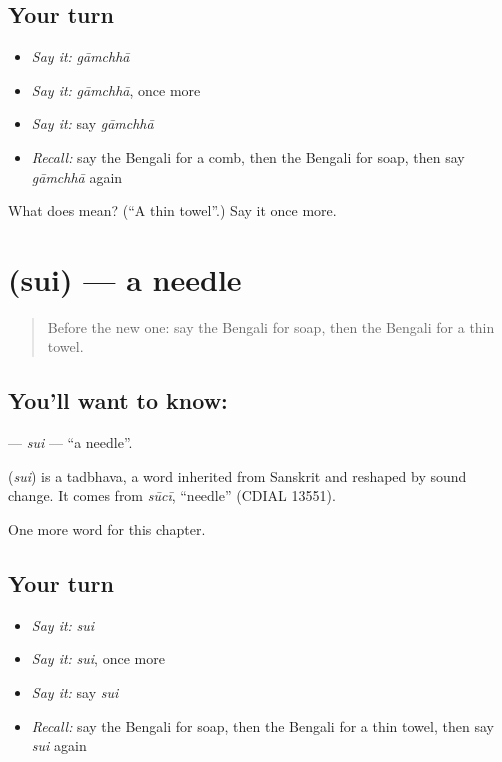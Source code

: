 \subsection*{Your turn}
\begin{itemize}
\raggedright
  \item \emph{Say it:} \emph{gāmchhā}
  \item \emph{Say it:} \emph{gāmchhā}, once more
  \item \emph{Say it:} say \emph{gāmchhā}
  \item \emph{Recall:} say the Bengali for a comb, then the Bengali for soap, then say \emph{gāmchhā} again
\end{itemize}

\begin{tcolorbox}[breakable,colback=teal!4,colframe=teal!35!black,title={Before you move on}]
What does  mean? (\textquotedblleft{}A thin towel\textquotedblright{}.) Say it once more.
\end{tcolorbox}
\section[\texorpdfstring{\bn{সুই} (sui)}{সুই (sui)}]{ (sui) — a needle}

\label{lesson:BN-C109-sui}



\begin{quote}
Before the new one: say the Bengali for soap, then the Bengali for a thin towel.
\end{quote}

\subsection*{You'll want to know: }
\textbf{} — \emph{sui} — \textquotedblleft{}a needle\textquotedblright{}.

\begin{cousinweb}
\textbf{} (\emph{sui}) is a tadbhava, a word inherited from Sanskrit and reshaped by sound change. It comes from \emph{sūcī}, \textquotedblleft{}needle\textquotedblright{} (CDIAL 13551).
\end{cousinweb}

\begin{grammarlens}[title={What you've built}]
One more word for this chapter.
\end{grammarlens}

\subsection*{Your turn}
\begin{itemize}
\raggedright
  \item \emph{Say it:} \emph{sui}
  \item \emph{Say it:} \emph{sui}, once more
  \item \emph{Say it:} say \emph{sui}
  \item \emph{Recall:} say the Bengali for soap, then the Bengali for a thin towel, then say \emph{sui} again
\end{itemize}

